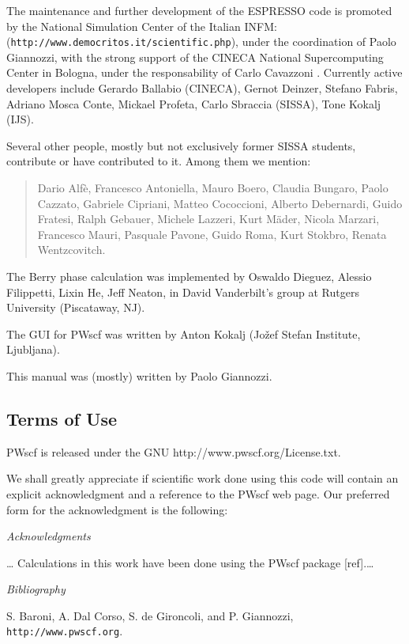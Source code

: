 \documentclass[12pt]{article}
\begin{document}
The maintenance and further development of the ESPRESSO code is promoted 
by the 
National Simulation Center of the Italian INFM: \\
({\tt http://www.democritos.it/scientific.php}), under the coordination of 
Paolo Giannozzi, with the strong support of the CINECA National
Supercomputing Center in Bologna, under the responsability of 
Carlo Cavazzoni
. 
Currently active developers include Gerardo Ballabio (CINECA),
Gernot Deinzer, Stefano Fabris, Adriano Mosca Conte, Mickael Profeta, 
Carlo Sbraccia (SISSA), Tone Kokalj (IJS).

Several other people, mostly but not exclusively former SISSA students, 
contribute or have contributed to it. Among them we mention:
\begin{quote}
Dario Alf\`e, Francesco Antoniella, Mauro Boero, Claudia Bungaro,
Paolo Cazzato, Gabriele Cipriani, Matteo Cococcioni, Alberto Debernardi, 
Guido Fratesi, Ralph Gebauer, Michele Lazzeri, Kurt M\"ader,
Nicola Marzari, Francesco Mauri, Pasquale Pavone, Guido Roma, 
Kurt Stokbro, Renata Wentzcovitch.
\end{quote}

The Berry phase calculation was implemented by Oswaldo Dieguez, 
Alessio Filippetti, Lixin He, Jeff Neaton, in David Vanderbilt's 
group at Rutgers University (Piscataway, NJ).

The GUI for PWscf was written by Anton Kokalj (Jo\v{z}ef Stefan 
Institute, Ljubljana).

This manual was (mostly) written by Paolo Giannozzi.

\subsection{Terms of Use}

PWscf is released under the GNU 
{http://www.pwscf.org/License.txt}.

We shall greatly appreciate if scientific work done using this code will
contain an explicit acknowledgment and a reference to the PWscf web
page. Our preferred form for the acknowledgment is the following:

\par\noindent
{\em Acknowledgments}
\par\noindent\dots
Calculations in this work have been done using the PWscf package [ref].\dots
\par\noindent
{\em Bibliography}
\par\noindent
[ref] S. Baroni, A. Dal Corso, S. de Gironcoli, and P. Giannozzi,
{\tt http://www.pwscf.org}.
\end{document}
